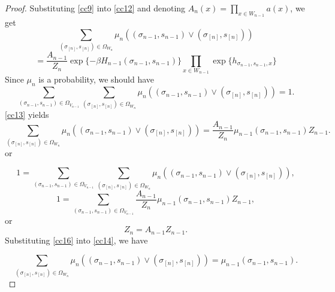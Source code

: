 \documentclass[10pt,a4paper]{amsart}
\begin{document}
\begin{proof}
Substituting \eqref{cc9} into \eqref{cc12} and denoting $A_n(x)=\prod\limits_{x\in W_{n-1}}a(x)$, we get
$$\sum\limits_{(\sigma_{[n]}, s_{[n]})  \in {\Omega _{{W_n}}}} \mu_{n}((\sigma_{n-1}, s_{n-1}) \vee (\sigma_{[n]}, s_{[n]}))$$
\begin{equation}\label{cc13}
  = \frac{A_{n-1}}{Z_n}\exp\{-\beta H_{n-1}(\sigma_{n-1},s_{n-1})\} \prod\limits_{x\in W_{n-1}}\exp\{h_{\sigma_{n-1},s_{n-1},x}\}
\end{equation}
Since $\mu_{n}$ is a probability, we should have
$$\sum\limits_{(\sigma_{n-1}, s_{n-1})\in \Omega_{V_{n-1}}}\sum\limits_{(\sigma_{[n]}, s_{[n]})  \in {\Omega _{{W_n}}}} \mu_{n}((\sigma_{n-1}, s_{n-1}) \vee (\sigma_{[n]}, s_{[n]}))=1.$$
\eqref{cc13} yields
\begin{equation}\label{cc14}
\sum\limits_{(\sigma_{[n]}, s_{[n]})  \in {\Omega _{{W_n}}}} \mu_{n}((\sigma_{n-1}, s_{n-1}) \vee (\sigma_{[n]}, s_{[n]})) = \frac{A_{n-1}}{Z_n}\mu_{n-1}(\sigma_{n-1}, s_{n-1}) Z_{n-1}.
\end{equation}
or

$$1=\sum\limits_{(\sigma_{n-1}, s_{n-1})\in \Omega_{V_{n-1}}}\sum\limits_{(\sigma_{[n]}, s_{[n]})  \in {\Omega _{{W_n}}}} \mu_{n}((\sigma_{n-1}, s_{n-1}) \vee (\sigma_{[n]}, s_{[n]})),$$
\begin{equation}\label{cc15}
1=\sum\limits_{(\sigma_{n-1}, s_{n-1})\in \Omega_{V_{n-1}}}\frac{A_{n-1}}{Z_n}\mu_{n-1}(\sigma_{n-1}, s_{n-1}) Z_{n-1},
\end{equation}
or
\begin{equation}\label{cc16}
Z_n=A_{n-1}Z_{n-1}.
\end{equation}
Substituting \eqref{cc16} into \eqref{cc14}, we have

\begin{equation}\label{cc17}
\sum\limits_{(\sigma_{[n]}, s_{[n]})  \in {\Omega _{{W_n}}}} \mu_{n}((\sigma_{n-1}, s_{n-1}) \vee (\sigma_{[n]}, s_{[n]})) = \mu_{n-1}(\sigma_{n-1}, s_{n-1}).
\end{equation}
\end{proof}
\end{document}
